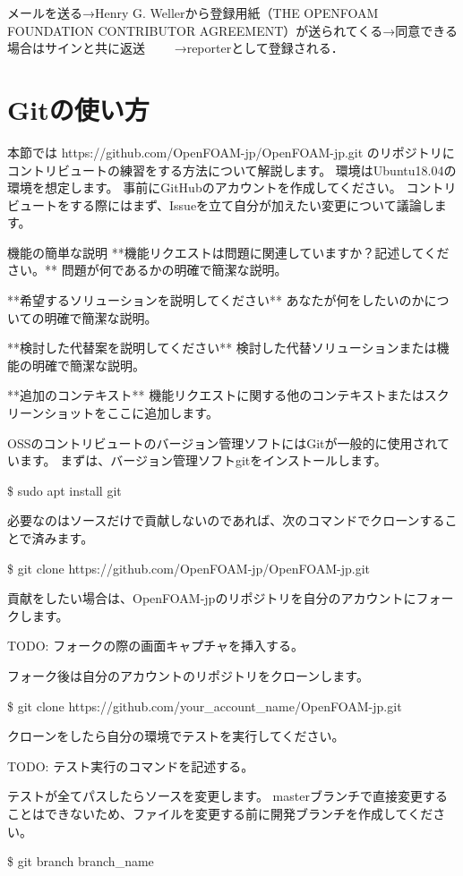 \documentclass{ltjoc}
\begin{document}
メールを送る→Henry G. Wellerから登録用紙（THE OPENFOAM FOUNDATION CONTRIBUTOR AGREEMENT）が送られてくる→同意できる場合はサインと共に返送　
　→reporterとして登録される．

\section{Gitの使い方}
本節では https://github.com/OpenFOAM-jp/OpenFOAM-jp.git 
のリポジトリにコントリビュートの練習をする方法について解説します。
環境はUbuntu18.04の環境を想定します。
事前に{GitHub}のアカウントを作成してください。
コントリビュートをする際にはまず、Issueを立て自分が加えたい変更について議論します。

機能の簡単な説明
**機能リクエストは問題に関連していますか？記述してください。**
問題が何であるかの明確で簡潔な説明。

**希望するソリューションを説明してください**
あなたが何をしたいのかについての明確で簡潔な説明。

**検討した代替案を説明してください**
検討した代替ソリューションまたは機能の明確で簡潔な説明。

**追加のコンテキスト**
機能リクエストに関する他のコンテキストまたはスクリーンショットをここに追加します。

OSSのコントリビュートのバージョン管理ソフトにはGitが一般的に使用されています。
まずは、バージョン管理ソフトgitをインストールします。

\$ sudo apt install git

必要なのはソースだけで貢献しないのであれば、次のコマンドでクローンすることで済みます。

\$ git clone https://github.com/OpenFOAM-jp/OpenFOAM-jp.git

貢献をしたい場合は、OpenFOAM-jpのリポジトリを自分のアカウントにフォークします。

TODO: フォークの際の画面キャプチャを挿入する。

フォーク後は自分のアカウントのリポジトリをクローンします。

\$ git clone https://github.com/your\_account\_name/OpenFOAM-jp.git

クローンをしたら自分の環境でテストを実行してください。

TODO: テスト実行のコマンドを記述する。

テストが全てパスしたらソースを変更します。
masterブランチで直接変更することはできないため、ファイルを変更する前に開発ブランチを作成してください。

\$ git branch branch\_name
\end{document}
